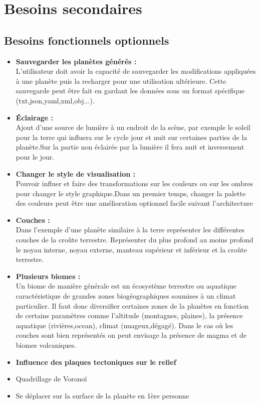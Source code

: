 \documentclass[a4paper]{article}
\begin{document}
\newpage
\section{Besoins secondaires}

\subsection{Besoins fonctionnels optionnels}
\begin{itemize}
\item \textbf{Sauvegarder les planètes générés :} \\
    L'utilisateur doit avoir la capacité de sauvegarder les modifications appliquées à une planète puis la recharger pour une utilisation ultérieure. Cette sauvegarde peut être fait en gardant les données sous un format spécifique (txt,json,yaml,xml,obj...).
    
\item \textbf{Éclairage :} \\
    Ajout d'une source de lumière à un endroit de la scène, par exemple le soleil pour la terre qui influera sur le cycle jour et nuit sur certaines parties de la planète.Sur la partie non éclairée par la lumière il fera nuit et inversement pour le jour. 
    
\item \textbf{Changer le style de visualisation :} \\
    Pouvoir influer et faire des transformations sur les couleurs ou sur les ombres pour changer le style graphique.Dans un premier temps, changer la palette des couleurs peut être une amélioration optionnel facile suivant l'architecture

\item \textbf{Couches :}\\
    Dans l'exemple d'une planète similaire à la terre représenter les différentes couches de la croûte terrestre. Représenter du plus profond au moins profond le noyau interne, noyau externe, manteau supérieur et inférieur et la croûte terrestre.
    
\item \textbf{Plusieurs biomes :}\\
    Un biome de manière générale est un écosystème terrestre ou aquatique caractéristique de grandes zones biogéographiques soumises à un climat particulier. Il faut donc diversifier certaines zones de la planètes en fonction de certains paramètres comme l'altitude (montagnes, plaines), la présence aquatique (rivières,ocean), climat (nuageux,dégagé). Dans le cas où les couches sont bien représentés on peut envisage la présence de magma et de biomes volcaniques.


\item \textbf{Influence des plaques tectoniques sur le relief}

\item Quadrillage de Voronoï


\item Se déplacer sur la surface de la planète en 1ère personne
\end{itemize}
    
\end{document}
